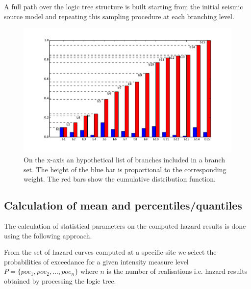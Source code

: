A full path over the logic tree structure is built starting from the 
initial seismic source model and repeating this sampling procedure 
at each branching level.
%
\begin{figure}[ht]
\centering
\includegraphics[trim = 20mm 5mm 5mm 10mm, clip, width=14cm]
    {./Pictures/lts/histogram_mc_sampl.pdf}
\caption{On the x-axis an hypothetical list of branches 
    included in a branch set. The height of the blue bar is proportional to 
    the corresponding weight. The red bars show the cumulative distribution 
    function.}
\label{fig:logic_tree_mc_samp}
\end{figure}
%
\subsection{Calculation of mean and percentiles/quantiles}
The calculation of statistical parameters on the computed hazard results
is done using the following approach.

From the set of hazard curves computed at a specific site we select 
the probabilities of exceedance for a given intensity measure level
$P=\{poe_1, poe_2, ..., poe_n\}$ where $n$ is the number of realisations
i.e. hazard results obtained by processing the logic tree.


